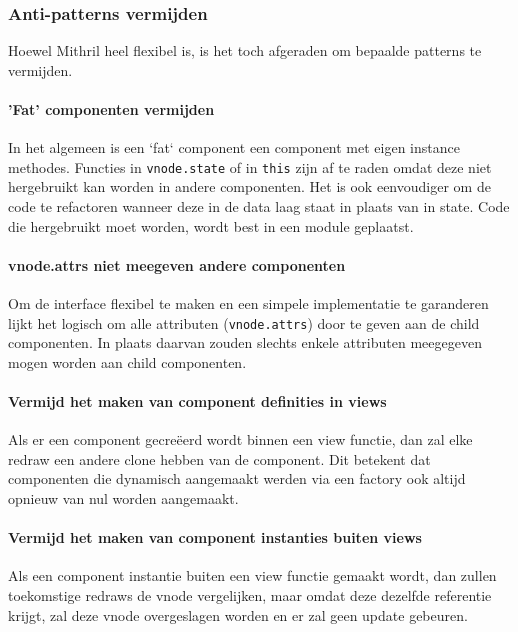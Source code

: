 \subsubsection{Anti-patterns vermijden}

Hoewel Mithril heel flexibel is, is het toch afgeraden om bepaalde patterns te vermijden. \autocite{Mithril2019a}

\paragraph{'Fat' componenten vermijden}

In het algemeen is een `fat` component een component met eigen instance methodes. Functies in \texttt{vnode.state} of in \texttt{this} zijn af te raden omdat deze niet hergebruikt kan worden in andere componenten. Het is ook eenvoudiger om de code te refactoren wanneer deze in de data laag staat in plaats van in state. Code die hergebruikt moet worden, wordt best in een module geplaatst. \autocite{Mithril2019a}

\paragraph{vnode.attrs niet meegeven andere componenten}

Om de interface flexibel te maken en een simpele implementatie te garanderen lijkt het logisch om alle attributen (\texttt{vnode.attrs}) door te geven aan de child componenten. In plaats daarvan zouden slechts enkele attributen meegegeven mogen worden aan child componenten. \autocite{Mithril2019a}

\paragraph{Vermijd het maken van component definities in views}

Als er een component gecreëerd wordt binnen een view functie, dan zal elke redraw een andere clone hebben van de component. Dit betekent dat componenten die dynamisch aangemaakt werden via een factory  ook altijd opnieuw van nul worden aangemaakt. \autocite{Mithril2019a}

\paragraph{Vermijd het maken van component instanties buiten views}

Als een component instantie buiten een view functie gemaakt wordt, dan zullen toekomstige redraws de vnode vergelijken, maar omdat deze dezelfde referentie krijgt, zal deze vnode overgeslagen worden en er zal geen update gebeuren.  \autocite{Mithril2019a}

